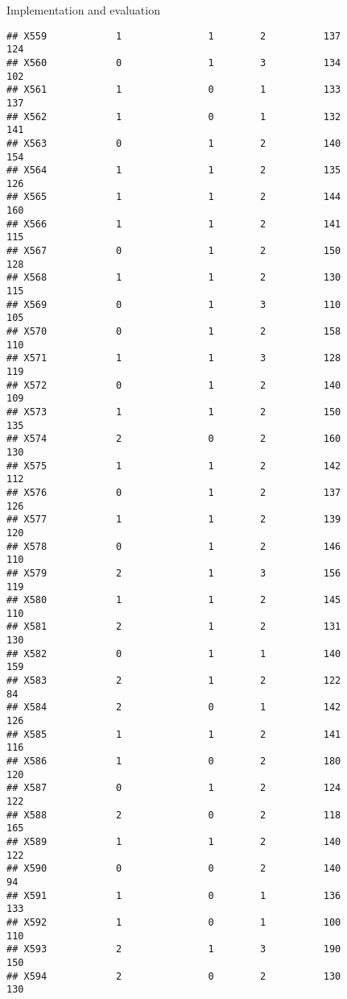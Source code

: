 \documentclass[
  ignorenonframetext,
]{beamer}
\begin{document}
\begin{frame}[fragile]{Implementation and evaluation}
\begin{verbatim}
## X559            1               1        2          137            124
## X560            0               1        3          134            102
## X561            1               0        1          133            137
## X562            1               0        1          132            141
## X563            0               1        2          140            154
## X564            1               1        2          135            126
## X565            1               1        2          144            160
## X566            1               1        2          141            115
## X567            0               1        2          150            128
## X568            1               1        2          130            115
## X569            0               1        3          110            105
## X570            0               1        2          158            110
## X571            1               1        3          128            119
## X572            0               1        2          140            109
## X573            1               1        2          150            135
## X574            2               0        2          160            130
## X575            1               1        2          142            112
## X576            0               1        2          137            126
## X577            1               1        2          139            120
## X578            0               1        2          146            110
## X579            2               1        3          156            119
## X580            1               1        2          145            110
## X581            2               1        2          131            130
## X582            0               1        1          140            159
## X583            2               1        2          122             84
## X584            2               0        1          142            126
## X585            1               1        2          141            116
## X586            1               0        2          180            120
## X587            0               1        2          124            122
## X588            2               0        2          118            165
## X589            1               1        2          140            122
## X590            0               0        2          140             94
## X591            1               0        1          136            133
## X592            1               0        1          100            110
## X593            2               1        3          190            150
## X594            2               0        2          130            130

\end{verbatim}
\end{frame}
\end{document}
